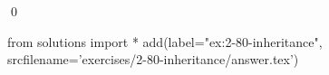 
\begin{ex}
  \label{ex:2-80-inheritance}
  
  \qed
\end{ex}
\begin{python0}
from solutions import *
add(label="ex:2-80-inheritance",
    srcfilename='exercises/2-80-inheritance/answer.tex')
\end{python0}
